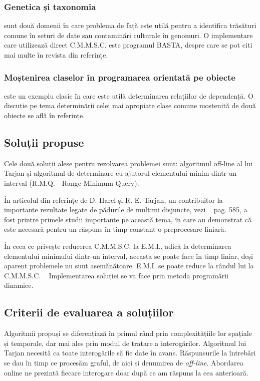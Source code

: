 \documentclass[runningheads]{llncs}
\begin{document}
\subsubsection{Genetica și taxonomia} sunt două domenii în care problema de față este utilă pentru a identifica trăsături comune în seturi de date sau contaminări culturale în genomuri. O implementare care utilizează direct C.M.M.S.C. este programul BASTA, despre care se pot citi mai multe în revista din referințe.~\cite{lca_taxonomie}

\subsubsection{Moștenirea claselor în programarea orientată pe obiecte} este un exemplu clasic în care este utilă determinarea relațiilor de dependență. O discuție pe tema determinării celei mai apropiate clase comune moștenită de două obiecte se află în referințe. ~\cite{lca_mostenire}

\subsection{Soluții propuse}

Cele două soluții alese pentru rezolvarea problemei sunt: algoritmul off-line al lui Tarjan și algoritmul de determinare cu ajutorul elementului minim dintr-un interval (R.M.Q. - Range Minimum Query).

În articolul din referințe de D. Harel și R. E. Tarjan, un contribuitor la importante rezultate legate de pădurile de mulțimi disjuncte, vezi ~\cite{CLRS} pag. 585, a fost printre primele studii importante pe această tema, în care au demonstrat că este necesară pentru un răspuns în timp constant o preprocesare liniară. ~\cite{Harel_Tarjan}

În ceea ce privește reducerea C.M.M.S.C. la E.M.I., adică la determinarea elementului minimului dintr-un interval, aceasta se poate face în timp liniar, deși aparent problemele nu sunt asemănătoare. E.M.I. se poate reduce la rândul lui la C.M.M.S.C. ~\cite{lca_algopedia} Implementarea soluției se va face prin metoda programării dinamice.

\subsection{Criterii de evaluarea a soluțiilor}

Algoritmii propuși se diferențiază în primul rând prin complexitățiile lor spațiale și temporale, dar mai ales prin modul de tratare a interogărilor. Algoritmul lui Tarjan necesită ca toate interogările să fie date în avans. Răspunsurile la întrebări se dau în timp ce procesăm graful, de aici și denumirea de \emph{off-line}. Abordarea online ne prezintă fiecare interogare doar după ce am răspuns la cea anterioară.
\end{document}
